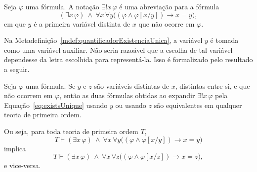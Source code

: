 \begin{metadefinition}\label{mdef:quantificadorExistenciaUnica}
    Seja $\varphi$ uma fórmula.
    A notação $\exists!x\,\varphi$ é uma abreviação para a fórmula
    \begin{equation}\label{eq:existsUnique}
        (\exists x\,\varphi)\ \wedge\ \forall x\,\forall y\bigl((\varphi \wedge \varphi[x/y])\rightarrow x=y\bigr),
    \end{equation}
        em que $y$ é a primeira variável distinta de $x$ que não ocorre em $\varphi$.
\end{metadefinition}

Na Metadefinição~\ref{mdef:quantificadorExistenciaUnica}, a variável $y$ é tomada como uma variável auxiliar.
Não seria razoável que a escolha de tal variável dependesse da letra escolhida para representá-la.
Isso é formalizado pelo resultado a seguir.


\begin{metalemma}\label{mlem:independenciaAuxiliarExistsUnique}
    Seja $\varphi$ uma fórmula.
    Se $y$ e $z$ são variáveis distintas de $x$, distintas entre si, e que não ocorrem em $\varphi$, então as duas fórmulas obtidas ao expandir
    $\exists!x\,\varphi$ pela Equação~\eqref{eq:existsUnique} usando $y$ ou usando $z$ são equivalentes em qualquer teoria de primeira ordem.

    Ou seja, para toda teoria de primeira ordem $T$,
    \[
        T\vdash
        (\exists x\,\varphi)\ \wedge\ 
        \forall x\,\forall y\bigl((\varphi \wedge \varphi[x/y])\rightarrow x=y\bigr)
    \]
    implica
    \[
        T\vdash
        (\exists x\,\varphi)\ \wedge\ 
        \forall x\,\forall z\bigl((\varphi \wedge \varphi[x/z])\rightarrow x=z\bigr),
    \]
    e vice-versa.
\end{metalemma}

